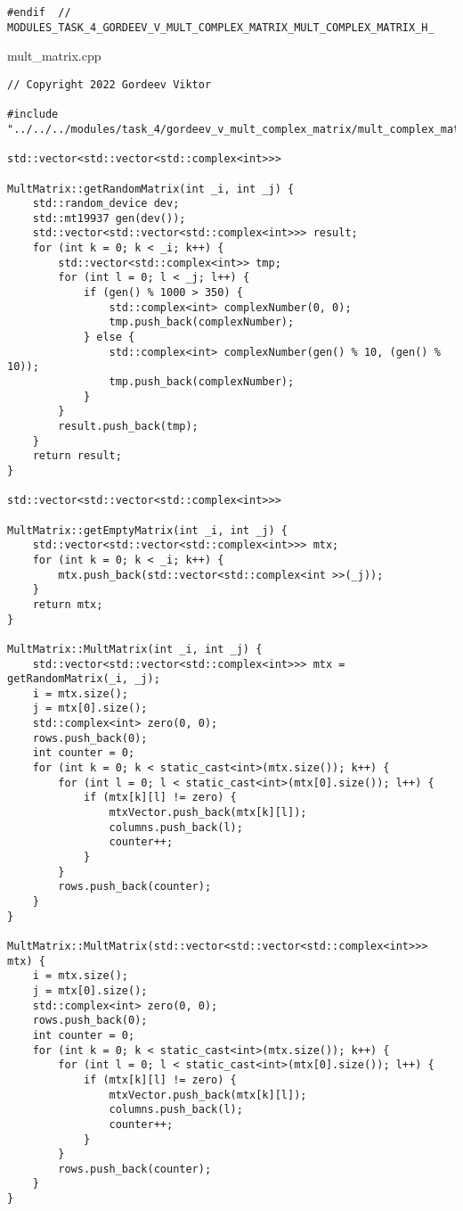 \documentclass{report}
\begin{document}
\begin{enumerate}
\begin{lstlisting}
#endif  // MODULES_TASK_4_GORDEEV_V_MULT_COMPLEX_MATRIX_MULT_COMPLEX_MATRIX_H_

\end{lstlisting}
mult_matrix.cpp
\begin{lstlisting}
// Copyright 2022 Gordeev Viktor

#include "../../../modules/task_4/gordeev_v_mult_complex_matrix/mult_complex_matrix.h"

std::vector<std::vector<std::complex<int>>>

MultMatrix::getRandomMatrix(int _i, int _j) {
    std::random_device dev;
    std::mt19937 gen(dev());
    std::vector<std::vector<std::complex<int>>> result;
    for (int k = 0; k < _i; k++) {
        std::vector<std::complex<int>> tmp;
        for (int l = 0; l < _j; l++) {
            if (gen() % 1000 > 350) {
                std::complex<int> complexNumber(0, 0);
                tmp.push_back(complexNumber);
            } else {
                std::complex<int> complexNumber(gen() % 10, (gen() % 10));
                tmp.push_back(complexNumber);
            }
        }
        result.push_back(tmp);
    }
    return result;
}

std::vector<std::vector<std::complex<int>>>

MultMatrix::getEmptyMatrix(int _i, int _j) {
    std::vector<std::vector<std::complex<int>>> mtx;
    for (int k = 0; k < _i; k++) {
        mtx.push_back(std::vector<std::complex<int >>(_j));
    }
    return mtx;
}

MultMatrix::MultMatrix(int _i, int _j) {
    std::vector<std::vector<std::complex<int>>> mtx = getRandomMatrix(_i, _j);
    i = mtx.size();
    j = mtx[0].size();
    std::complex<int> zero(0, 0);
    rows.push_back(0);
    int counter = 0;
    for (int k = 0; k < static_cast<int>(mtx.size()); k++) {
        for (int l = 0; l < static_cast<int>(mtx[0].size()); l++) {
            if (mtx[k][l] != zero) {
                mtxVector.push_back(mtx[k][l]);
                columns.push_back(l);
                counter++;
            }
        }
        rows.push_back(counter);
    }
}

MultMatrix::MultMatrix(std::vector<std::vector<std::complex<int>>> mtx) {
    i = mtx.size();
    j = mtx[0].size();
    std::complex<int> zero(0, 0);
    rows.push_back(0);
    int counter = 0;
    for (int k = 0; k < static_cast<int>(mtx.size()); k++) {
        for (int l = 0; l < static_cast<int>(mtx[0].size()); l++) {
            if (mtx[k][l] != zero) {
                mtxVector.push_back(mtx[k][l]);
                columns.push_back(l);
                counter++;
            }
        }
        rows.push_back(counter);
    }
}


\end{lstlisting}
\end{enumerate}
\end{document}
